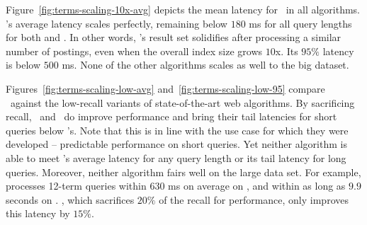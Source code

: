 {{Figure~\ref{fig:terms-scaling-10x-avg} depicts the mean latency for \cwten\ in all algorithms.
 \alg's average  latency scales perfectly, 
remaining below $180$ ms for all query lengths
 for both \cw\/ and \cwten.  
In other words, \alg's result set solidifies after processing 
a similar number of postings,  even when the overall index size grows $10$x. 
Its  $95\%$ latency is below $500$ ms. 
None of the other algorithms scales as well to the big dataset.

Figures~\ref{fig:terms-scaling-low-avg} and~\ref{fig:terms-scaling-low-95} 
compare  \alg\hi\  against the low-recall variants of state-of-the-art web algorithms. 
By sacrificing recall, \pBMW\ and \pJASS\ do improve performance and bring their tail latencies for short queries below \alg's. 
Note that this is in line with the use case for which they were developed -- predictable performance on short queries.
Yet neither algorithm is able to meet \alg's average latency for any query length or its tail latency for long queries. Moreover, 
neither algorithm fairs well on the large data set. 
For example, \pBMW\hi\/  processes 12-term queries  within $630$ ms on average on \cw, and within as long as $9.9$ seconds on \cwten. 
\pBMW\lo, which sacrifices $20\%$ of the recall for performance, only improves this latency by $15\%$.

\begin{figure}[tbh]


\end{figure}}}
